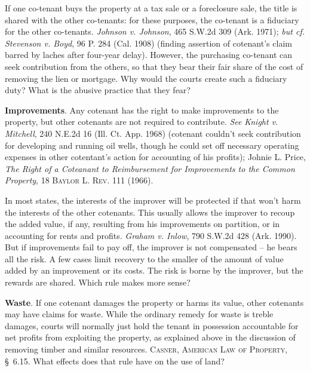 If one co-tenant buys the property at a tax sale or a foreclosure sale, the
title is shared with the other co-tenants: for these purposes, the co-tenant is
a fiduciary for the other co-tenants. \emph{Johnson v. Johnson}, 465 S.W.2d 309
(Ark. 1971); \textit{but cf.} \emph{Stevenson v. Boyd}, 96 P. 284 (Cal. 1908)
(finding assertion of cotenant's claim barred by laches after four-year delay).
However, the purchasing co-tenant can seek contribution from the others, so that
they bear their fair share of the cost of removing the lien or mortgage. Why
would the courts create such a fiduciary duty? What is the abusive practice that
they fear?


\item \label{martin-improvements}\textbf{Improvements}. Any cotenant has the
right
to make improvements to the property, but other cotenants are not required to
contribute. \emph{See} \emph{Knight v. Mitchell}, 240 N.E.2d 16 (Ill. Ct. App.
1968) (cotenant couldn't seek contribution for developing and running oil wells,
though he could set off necessary operating expenses in other cotentant's action
for accounting of his profits); Johnie L. Price, \textit{The Right of a
Coteanant to Reimbursement for Improvements to the Common Property}, 18
\textsc{Baylor L. Rev}. 111 (1966).

In most states, the interests of the improver will be protected if that won't
harm the interests of the other cotenants. This usually allows the improver to
recoup the added value, if any, resulting from his improvements on partition, or
in accounting for rents and profits. \emph{Graham v. Inlow}, 790 S.W.2d 428
(Ark. 1990). But if improvements fail to pay off, the improver is not
compensated -- he bears all the risk. A few cases limit recovery to the smaller
of the amount of value added by an improvement or its costs. The risk is borne
by the improver, but the rewards are shared. Which rule makes more sense?

\item \textbf{Waste}. If one cotenant damages the property or harms
its value, other cotenants may have claims for waste. While the ordinary
remedy for waste is treble damages, courts will normally just hold the tenant
in possession accountable for net profits from exploiting the property, as
explained above in the discussion of removing timber and similar resources.
\textsc{Casner, American Law of Property}, \S~6.15. What effects does that
rule have on the use of land?


